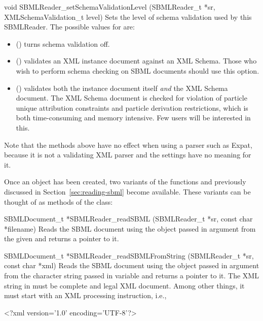 \documentclass{sbmlmanual}
\begin{document}
\begin{methoddef}{void SBMLReader\_setSchemaValidationLevel (SBMLReader\_t *sr,
XMLSchemaValidation\_t level)}
  Sets the level of schema validation used by this SBMLReader.
  The possible values for  are:
  \begin{itemize}
  \item {} () turns schema
    validation off.
    
  \item {} () validates an XML
    instance document against an XML Schema.  Those who wish to perform
    schema checking on SBML documents should use this option.
    
  \item {} () validates both the
    instance document itself \emph{and} the XML Schema document.  The XML
    Schema document is checked for violation of particle unique attribution
    constraints and particle derivation restrictions, which is both
    time-consuming and memory intensive.  Few users will be interested in
    this. 
  \end{itemize}
\end{methoddef}

Note that the  methods above have no effect when
using a parser such as Expat, because it is not a validating XML parser and
the settings have no meaning for it.

Once an  object has been created, two variants of the
functions  and  previously
discussed in Section~\ref{sec:reading-sbml} become available.  These
variants can be thought of as methods of the  class:


\begin{methoddef}{SBMLDocument\_t *SBMLReader\_readSBML (SBMLReader\_t *sr,
const char *filename)}
Reads the SBML document using the  object passed in
argument  from the given  and returns a
pointer to it.
\end{methoddef}

\begin{methoddef}{SBMLDocument\_t *SBMLReader\_readSBMLFromString (SBMLReader\_t *sr,\\
const char *xml)}
Reads the SBML document using the  object passed in
argument  from the character string passed in variable
 and returns a pointer to it.  The XML string in
 must be complete and legal XML document.  Among other
things, it must start with an XML processing instruction, i.e.,
  \begin{example}
    <?xml version='1.0' encoding='UTF-8'?>
  \end{example}
\end{methoddef}
\end{document}
